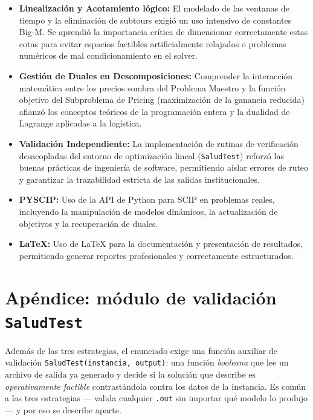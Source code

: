 \documentclass[12pt]{article}
\numberwithin{algorithm}{section}
\begin{document}
\begin{itemize}
    \item \textbf{Linealización y Acotamiento lógico:} El modelado de las ventanas de tiempo y la eliminación de subtours exigió un uso intensivo de constantes Big-M. Se aprendió la importancia crítica de dimensionar correctamente estas cotas para evitar espacios factibles artificialmente relajados o problemas numéricos de mal condicionamiento en el solver.
    \item \textbf{Gestión de Duales en Descomposiciones:} Comprender la interacción matemática entre los precios sombra del Problema Maestro y la función objetivo del Subproblema de Pricing (maximización de la ganancia reducida) afianzó los conceptos teóricos de la programación entera y la dualidad de Lagrange aplicadas a la logística.
    \item \textbf{Validación Independiente:} La implementación de rutinas de verificación desacopladas del entorno de optimización lineal (\texttt{SaludTest}) reforzó las buenas prácticas de ingeniería de software, permitiendo aislar errores de ruteo y garantizar la trazabilidad estricta de las salidas institucionales.
    \item \textbf{PYSCIP:} Uso de la API de Python para SCIP en problemas reales, incluyendo la manipulación de modelos dinámicos, la actualización de objetivos y la recuperación de duales.
    \item \textbf{LaTeX:} Uso de LaTeX para la documentación y presentación de resultados, permitiendo generar reportes profesionales y correctamente estructurados.
\end{itemize}

\newpage
\section{Apéndice: módulo de validación \texttt{SaludTest}}
\label{sec:saludtest}

Además de las tres estrategias, el enunciado exige una función auxiliar de validación
\texttt{SaludTest(instancia, output)}: una función \emph{booleana} que lee un archivo de
salida ya generado y decide si la solución que describe es \emph{operativamente factible}
contrastándola contra los datos de la instancia. Es común a las tres estrategias --- valida
cualquier \texttt{.out} sin importar qué modelo lo produjo --- y por eso se describe aparte.
\end{document}
